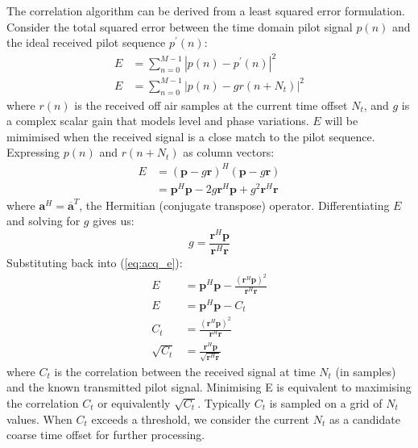 \documentclass{article}
\begin{document}
The correlation algorithm can be derived from a least squared error formulation.  Consider the total squared error between the time domain pilot signal $p(n)$ and the ideal received pilot sequence $p^\prime(n)$:
\begin{equation}
\begin{split}
E &= \sum^{M-1}_{n=0} | p(n) - p^\prime(n) |^2 \\
E &= \sum^{M-1}_{n=0} | p(n) - gr(n+N_t)|^2
\end{split}
\end{equation}
where $r(n)$ is the received off air samples at the current time offset $N_{t}$, and $g$ is a complex scalar gain that models level and phase variations.  $E$ will be mimimised when the received signal is a close match to the pilot sequence. Expressing $p(n)$ and $r(n+N_t)$ as column vectors:
\begin{equation}
\label{eq:acq_e}
\begin{split}
E &= (\bm{p}-g\bm{r})^H (\bm{p}-g\bm{r}) \\
  &= \bm{p}^H\bm{p} - 2g\bm{r}^H \bm{p} + g^2\bm{r}^H\bm{r}
\end{split}
\end{equation}
where $\bm{a}^H = \bm{\overline{a}}^T$, the Hermitian (conjugate transpose) operator. Differentiating $E$ and solving for $g$ gives us:
\begin{equation}
g = \frac{\bm{r}^H \bm{p}}{\bm{r}^H\bm{r}}
\end{equation}
Substituting back into (\ref{eq:acq_e}):
\begin{equation}
\label{eq:acq_corr}
\begin{split}
E &= \bm{p}^H\bm{p} - \frac{(\bm{r}^H \bm{p})^2}{\bm{r}^H\bm{r}} \\
E &= \bm{p}^H\bm{p} - C_t \\
C_t &= \frac{(\bm{r}^H \bm{p})^2}{\bm{r}^H\bm{r}} \\
\sqrt{C_t} &= \frac{\bm{r}^H \bm{p}}{\sqrt{\bm{r}^H\bm{r}}}
\end{split}
\end{equation}
where $C_t$ is the correlation between the received signal at time $N_t$ (in samples) and the known transmitted pilot signal. Minimising E is equivalent to maximising the correlation $C_t$ or equivalently $\sqrt{C_t}$. Typically $C_t$ is sampled on a grid of $N_t$ values.  When $C_t$ exceeds a threshold, we consider the current $N_t$ as a candidate coarse time offset for further processing.
\end{document}
